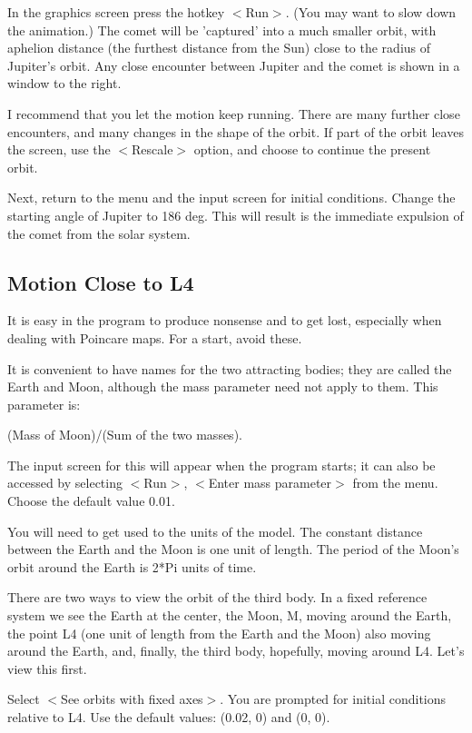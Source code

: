    In the graphics screen press the hotkey $<$Run$>$. (You may want to
slow down the animation.) The comet will be 'captured' into a much
smaller orbit, with aphelion distance (the furthest distance from
the Sun) close to the radius of Jupiter's orbit. Any close encounter
between Jupiter and the comet is shown in a window to the right.

   I recommend that you let the motion keep running. There are many
further close encounters, and many changes in the shape of the orbit.
If part of the orbit leaves the screen, use the $<$Rescale$>$ option, and
choose to continue the present orbit.

   Next, return to the menu and the input screen for initial conditions.
Change the starting angle of Jupiter to 186 deg. This will result is the
immediate expulsion of the comet from the solar system.



\subsection{Motion Close to L4}

   It is easy in the program to produce nonsense and to get lost,
especially when dealing with Poincare maps. For a start, avoid these.

   It is convenient to have names for the two attracting bodies;
they are called the Earth and Moon, although the mass parameter need not
apply to them. This parameter is:

      (Mass of Moon)/(Sum of the two masses).

The input screen for this will appear when the program starts; it can
also be accessed by selecting $<$Run$>$, $<$Enter mass parameter$>$ from
the menu. Choose the default value 0.01.

   You will need to get used to the units of the model. The constant
distance between the Earth and the Moon is one unit of length. The
period of the Moon's orbit around the Earth is 2*Pi units of time.

   There are two ways to view the orbit of the third body. In a
fixed reference system we see the Earth at the center, the Moon, M,
moving around  the Earth, the point L4 (one unit of length from the
Earth and the Moon) also moving around the Earth, and, finally, the
third body, hopefully, moving around L4. Let's view this first.

   Select $<$See orbits with fixed axes$>$. You are prompted for initial
conditions relative to L4. Use the default values: (0.02, 0) and (0, 0).

